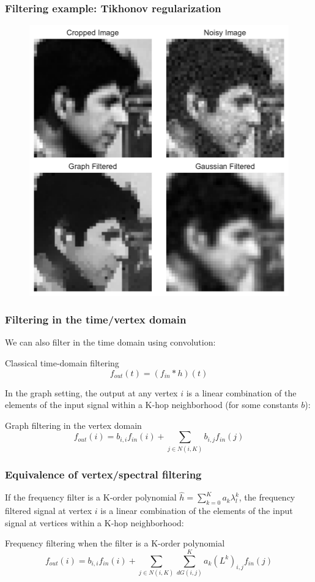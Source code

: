 \documentclass{beamer}
\begin{document}
\begin{frame}
  \frametitle{Filtering example: Tikhonov regularization}
\begin{figure}
\includegraphics[width=0.5\linewidth]{../img/tikhonov_regularization_2.pdf}
\end{figure}
\end{frame}


\begin{frame}
  \frametitle{Filtering in the time/vertex domain}

  We can also filter in the time domain using convolution:

  \begin{block}{Classical time-domain filtering}
    \begin{equation}
      f_{out}(t) = (f_{in} * h)(t) 
    \end{equation}
  \end{block}

  In the graph setting, the output at any vertex $i$ is a linear combination of the elements of
  the input signal within a K-hop neighborhood (for some constants $b$):
  
  \begin{block}{Graph filtering in the vertex domain}
    \begin{equation}
      f_{out}(i) = b_{i,i} f_{in}(i) + \sum_{j \in N(i, K)} b_{i,j} f_{in}(j)
    \end{equation}
  \end{block}  
\end{frame}

\begin{frame}
  \frametitle{Equivalence of vertex/spectral filtering}
  If the frequency filter is a K-order polynomial $\hat{h} = \sum_{k=0}^K a_k
  \lambda_l^k$, the frequency filtered signal at vertex $i$ is a linear combination of the
  elements of the input signal at vertices within a K-hop neighborhood:

  \begin{block}{Frequency filtering when the filter is a K-order polynomial}
    \begin{equation}
      f_{out}(i) = b_{i,i} f_{in}(i) + \sum_{j \in N(i, K)} \sum_{d G(i,j)}^K a_k (L^k)_{i,j} f_{in}(j)
    \end{equation}
  \end{block}  
\end{frame}
\end{document}
